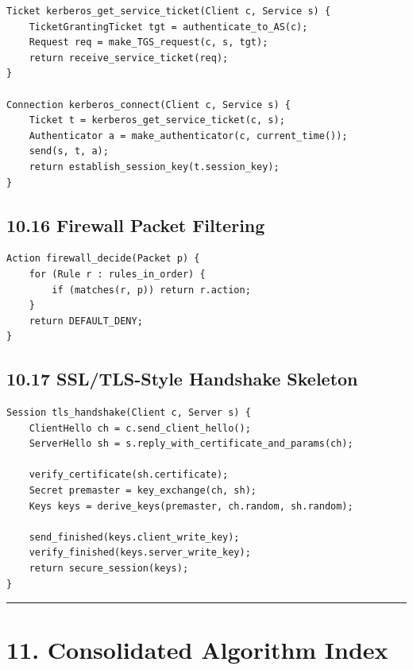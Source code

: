 \documentclass[11pt]{article}
\begin{document}
\begin{verbatim}
Ticket kerberos_get_service_ticket(Client c, Service s) {
    TicketGrantingTicket tgt = authenticate_to_AS(c);
    Request req = make_TGS_request(c, s, tgt);
    return receive_service_ticket(req);
}

Connection kerberos_connect(Client c, Service s) {
    Ticket t = kerberos_get_service_ticket(c, s);
    Authenticator a = make_authenticator(c, current_time());
    send(s, t, a);
    return establish_session_key(t.session_key);
}
\end{verbatim}

\subsection{10.16 Firewall Packet
Filtering}\label{firewall-packet-filtering}

\begin{verbatim}
Action firewall_decide(Packet p) {
    for (Rule r : rules_in_order) {
        if (matches(r, p)) return r.action;
    }
    return DEFAULT_DENY;
}
\end{verbatim}

\subsection{10.17 SSL/TLS-Style Handshake
Skeleton}\label{ssltls-style-handshake-skeleton}

\begin{verbatim}
Session tls_handshake(Client c, Server s) {
    ClientHello ch = c.send_client_hello();
    ServerHello sh = s.reply_with_certificate_and_params(ch);

    verify_certificate(sh.certificate);
    Secret premaster = key_exchange(ch, sh);
    Keys keys = derive_keys(premaster, ch.random, sh.random);

    send_finished(keys.client_write_key);
    verify_finished(keys.server_write_key);
    return secure_session(keys);
}
\end{verbatim}

\begin{center}\rule{0.5\linewidth}{0.5pt}\end{center}

\section{11. Consolidated Algorithm
Index}\label{consolidated-algorithm-index}
\end{document}

